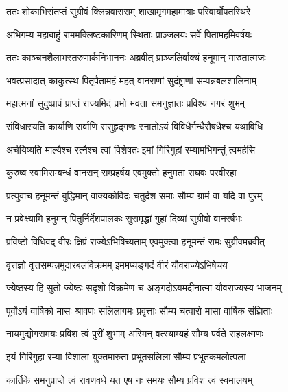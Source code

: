 
\twolineshloka
{ततः शोकाभिसंतप्तं सुग्रीवं क्लिन्नवाससम्}
{शाखामृगमहामात्राः परिवार्योपतस्थिरे} %

\twolineshloka
{अभिगम्य महाबाहुं राममक्लिष्टकारिणम्}
{स्थिताः प्राञ्जलयः सर्वे पितामहमिवर्षयः} %

\twolineshloka
{ततः काञ्चनशैलाभस्तरुणार्कनिभाननः}
{अब्रवीत् प्राञ्जलिर्वाक्यं हनूमान् मारुतात्मजः} %

\twolineshloka
{भवत्प्रसादात् काकुत्स्थ पितृपैतामहं महत्}
{वानराणां सुदंष्ट्राणां सम्पन्नबलशालिनाम्} %

\twolineshloka
{महात्मनां सुदुष्प्रापं प्राप्तं राज्यमिदं प्रभो}
{भवता समनुज्ञातः प्रविश्य नगरं शुभम्} %

\twolineshloka
{संविधास्यति कार्याणि सर्वाणि ससुहृद्गणः}
{स्नातोऽयं विविधैर्गन्धैरौषधैश्च यथाविधि} %

\twolineshloka
{अर्चयिष्यति माल्यैश्च रत्नैश्च त्वां विशेषतः}
{इमां गिरिगुहां रम्यामभिगन्तुं त्वमर्हसि} %

\twolineshloka
{कुरुष्व स्वामिसम्बन्धं वानरान् सम्प्रहर्षय}
{एवमुक्तो हनुमता राघवः परवीरहा} %

\twolineshloka
{प्रत्युवाच हनूमन्तं बुद्धिमान् वाक्यकोविदः}
{चतुर्दश समाः सौम्य ग्रामं वा यदि वा पुरम्} %

\twolineshloka
{न प्रवेक्ष्यामि हनुमन् पितुर्निर्देशपालकः}
{सुसमृद्धां गुहां दिव्यां सुग्रीवो वानरर्षभः} %

\twolineshloka
{प्रविष्टो विधिवद् वीरः क्षिप्रं राज्येऽभिषिच्यताम्}
{एवमुक्त्वा हनूमन्तं रामः सुग्रीवमब्रवीत्} %

\twolineshloka
{वृत्तज्ञो वृत्तसम्पन्नमुदारबलविक्रमम्}
{इममप्यङ्गदं वीरं यौवराज्येऽभिषेचय} %

\twolineshloka
{ज्येष्ठस्य हि सुतो ज्येष्ठः सदृशो विक्रमेण च}
{अङ्गदोऽयमदीनात्मा यौवराज्यस्य भाजनम्} %

\twolineshloka
{पूर्वोऽयं वार्षिको मासः श्रावणः सलिलागमः}
{प्रवृत्ताः सौम्य चत्वारो मासा वार्षिक संज्ञिताः} %

\twolineshloka
{नायमुद्योगसमयः प्रविश त्वं पुरीं शुभाम्}
{अस्मिन् वत्स्याम्यहं सौम्य पर्वते सहलक्ष्मणः} %

\twolineshloka
{इयं गिरिगुहा रम्या विशाला युक्तमारुता}
{प्रभूतसलिला सौम्य प्रभूतकमलोत्पला} %

\twolineshloka
{कार्तिके समनुप्राप्ते त्वं रावणवधे यत}
{एष नः समयः सौम्य प्रविश त्वं स्वमालयम्} %

